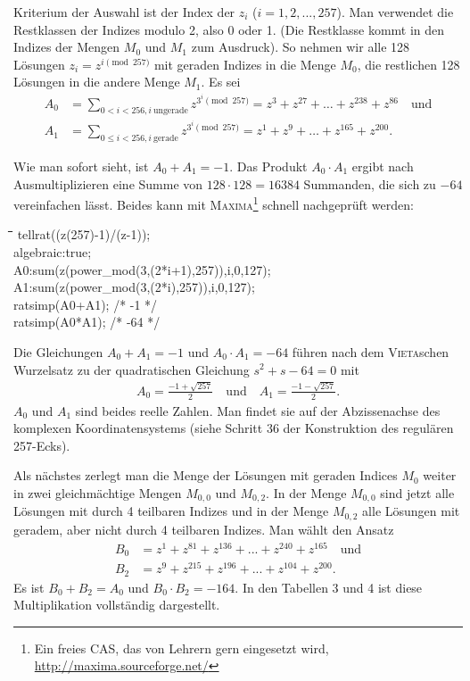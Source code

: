 \documentclass[11pt]{article}
\def\pw{{\char94}}
\newenvironment{code}{\tt \begin{tabbing}
\hskip12pt\=\hskip12pt\=\hskip12pt\=\hskip12pt\=\hskip5cm\=\hskip5cm\=\kill}
{\end{tabbing}}
\begin{document}
Kriterium der Auswahl ist der Index der $z_i$ ($i = 1, 2, ..., 257$). Man
verwendet die Restklassen der Indizes modulo 2, also 0 oder 1. (Die Restklasse
kommt in den Indizes der Mengen $M_0$ und $M_1$ zum Ausdruck). So nehmen wir
alle 128 Lösungen $z_i = z^{i \pmod{257}}$ mit geraden Indizes in die Menge
$M_0$, die restlichen 128 Lösungen in die andere Menge $M_1$. Es sei 
\begin{align*}
  A_0&= \sum_{0<i<256, i\ \text{ungerade}}{z^{3^i \pmod{257}}}
  =z^3+z^{27}+\ldots+z^{238}+z^{86} \quad \text{und}\\
  A_1 &= \sum_{0\le i <256, i\ \text{gerade}}{z^{3^i \pmod{257}}} =
  z^1+z^9+\ldots+z^{165}+z^{200}.
\end{align*}

Wie man sofort sieht, ist $A_0 + A_1 = -1$. Das Produkt $A_0 \cdot A_1$ ergibt
nach Ausmultiplizieren eine Summe von $128 \cdot 128 = 16384$ Summanden, die
sich zu $-64$ vereinfachen lässt. Beides kann mit \textsc{Maxima}\footnote{Ein
  freies CAS, das von Lehrern gern eingesetzt wird,
  \url{http://maxima.sourceforge.net/}} schnell nachgeprüft werden:
\begin{code}
tellrat((z\pw(257)-1)/(z-1));\\
algebraic:true;\\
A0:sum(z\pw(power\_mod(3,(2*i+1),257)),i,0,127);\\
A1:sum(z\pw(power\_mod(3,(2*i),257)),i,0,127);\\
ratsimp(A0+A1); /*  -1 */\\
ratsimp(A0*A1); /* -64 */
\end{code}

Die Gleichungen $A_0 + A_1 = -1$ und $A_0 \cdot A_1 = -64$ führen nach dem
\textsc{Vieta}schen Wurzelsatz zu der quadratischen Gleichung $s^2 + s - 64 =
0$ mit 
\begin{gather*}
  A_0=\frac{-1+\sqrt{257}}{2}\quad\text{und}\quad A_1=\frac{-1-\sqrt{257}}{2}.
\end{gather*}
$A_0$ und $A_1$ sind beides reelle Zahlen. Man findet sie auf der
Abzissenachse des komplexen Koordinatensystems (siehe Schritt 36 der
Konstruktion des regulären 257-Ecks).

Als nächstes zerlegt man die Menge der Lösungen mit geraden Indices $M_{0}$
weiter in zwei gleichmächtige Mengen $M_{0,0}$ und $M_{0,2}$. In der Menge
$M_{0,0}$ sind jetzt alle Lösungen mit durch 4 teilbaren Indizes und in der
Menge $M_{0,2}$ alle Lösungen mit geradem, aber nicht durch 4 teilbaren
Indizes.  Man wählt den Ansatz 
\begin{align*}
  B_0 &= z^1 + z^{81} + z^{136} + ... + z^{240} + z^{165}\quad\text{und}\\ B_2
  &= z^9 + z^{215} + z^{196} + ... + z^{104} + z^{200}.
\end{align*}
Es ist $B_0 + B_2 = A_0$ und $B_0 \cdot B_2 = -164$. In den Tabellen 3 und 4
ist diese Multiplikation vollständig dargestellt.
\end{document}
